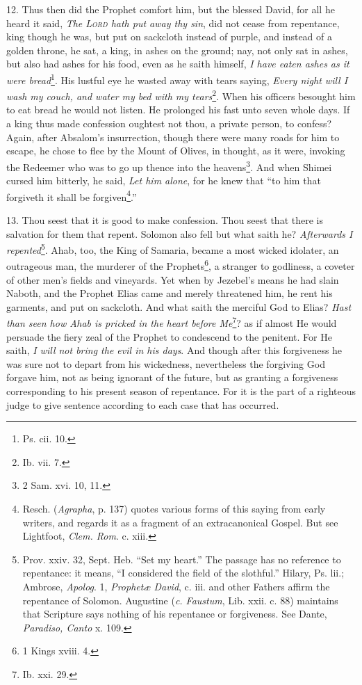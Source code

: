 12. Thus then did the Prophet comfort him, but the blessed David, for all he heard it said, \emph{The \textsc{Lord} hath put away thy sin}, did not cease from repentance, king though he was, but put on sackcloth instead of purple, and instead of a golden throne, he sat, a king, in ashes on the ground; nay, not only sat in ashes, but also had ashes for his food, even as he saith himself, \emph{I have eaten ashes as it were bread}\footnote{Ps. cii. 10.}. His lustful eye he wasted away with tears saying, \emph{Every night will I wash my couch, and water my bed with my tears}\footnote{Ib. vii. 7.}. When his officers besought him to eat bread he would not listen. He prolonged his fast unto seven whole days. If a king thus made confession oughtest not thou, a private person, to confess? Again, after Absalom’s insurrection, though there were many roads for him to escape, he chose to flee by the Mount of Olives, in thought, as it were, invoking the Redeemer who was to go up thence into the heavens\footnote{2 Sam. xvi. 10, 11.}. And when Shimei cursed him bitterly, he said, \emph{Let him alone}, for he knew that “to him that forgiveth it shall be forgiven\footnote{Resch. (\emph{Agrapha}, p. 137) quotes various forms of this saying from early writers, and regards it as a fragment of an extracanonical Gospel. But see Lightfoot, \emph{Clem. Rom}. c. xiii.}.”

13. Thou seest that it is good to make confession. Thou seest that there is salvation for them that repent. Solomon also fell but what saith he? \emph{Afterwards I repented}\footnote{Prov. xxiv. 32, Sept. Heb. “Set my heart.” The passage has no reference to repentance: it means, “I considered the field of the slothful.” Hilary, Ps. lii.; Ambrose, \emph{Apolog}. 1, \emph{Prophetæ David}, c. iii. and other Fathers affirm the repentance of Solomon. Augustine (\emph{c. Faustum}, Lib. xxii. c. 88) maintains that Scripture says nothing of his repentance or forgiveness. See Dante, \emph{Paradiso, Canto} x. 109.}. Ahab, too, the King of Samaria, became a most wicked idolater, an outrageous man, the murderer of the Prophets\footnote{1 Kings xviii. 4.}, a stranger to godliness, a coveter of other men’s fields and vineyards. Yet when by Jezebel’s means he had slain Naboth, and the Prophet Elias came and merely threatened him, he rent his garments, and put on sackcloth. And what saith the merciful God to Elias? \emph{Hast than seen how Ahab is pricked in the heart before Me}\footnote{Ib. xxi. 29.}? as if almost He would persuade the fiery zeal of the Prophet to condescend to the penitent. For He saith, \emph{I will not bring the evil in his days}. And though after this forgiveness he was sure not to depart from his wickedness, nevertheless the forgiving God forgave him, not as being ignorant of the future, but as granting a forgiveness corresponding to his present season of repentance. For it is the part of a righteous judge to give sentence according to each case that has occurred.


